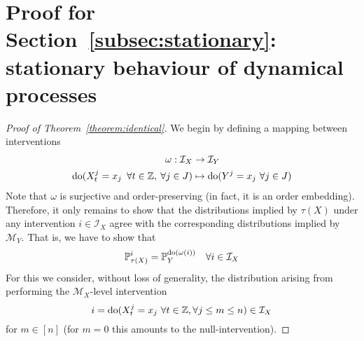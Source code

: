 \section{Proof for Section~\ref{subsec:stationary}: stationary behaviour of dynamical processes}\label{theorem:identical:appendix}

\begin{proof}[Proof of Theorem~\ref{theorem:identical}]
We begin by defining a mapping between interventions
\begin{align*}
\omega : \mathcal{I}_X &\rightarrow \mathcal{I}_Y \\
\operatorname{do}(X_t^j= x_j \enspace \forall t \in \mathbb{Z}, \: \forall j \in J) & \mapsto \operatorname{do}(Y^j= x_j \ \forall j \in J)
\end{align*}
%
Note that $\omega$ is surjective and order-preserving (in fact, it is an order embedding).
Therefore, it only remains to show that the distributions implied by $\tau(X)$ under any intervention $i\in\mathcal{I}_X$ agree with the corresponding distributions implied by $\mathcal{M}_Y$.
That is, we have to show that
\[ \mathbb{P}_{\tau(X)}^{i} = \mathbb{P}_{Y}^{\operatorname{do}(\omega(i))} \quad \forall i\in\mathcal{I}_X \]
%
For this we consider, without loss of generality, the distribution arising from performing the $\mathcal{M}_X$-level intervention
\[ i = \operatorname{do}(X_t^j=x_j\ \forall t\in\mathbb{Z},\forall j \leq m \leq n) \in \mathcal{I}_X \]
for $m \in [n]$ (for $m=0$ this amounts to the null-intervention).


\end{proof}
